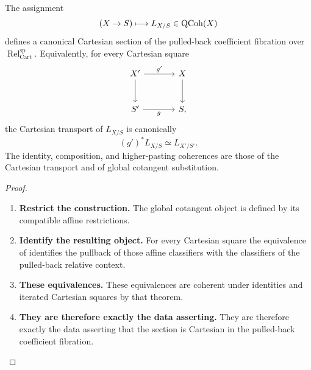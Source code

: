 \begin{theorem}
\label{thm:cotangent-cartesian-section}
The assignment
\[
    (X\to S)\longmapsto L_{X/S}\in\operatorname{QCoh}(X)
\]
defines a canonical Cartesian section of the pulled-back coefficient
fibration over \(\operatorname{Rel}^{\mathrm{sp}}_{\mathrm{Cart}}\).
Equivalently, for every Cartesian square
\[
\begin{tikzcd}[column sep=large,row sep=large]
    X' \arrow[r,"g'"] \arrow[d]
        & X \arrow[d]
    \\
    S' \arrow[r,"g"']
        & S,
\end{tikzcd}
\]
the Cartesian transport of \(L_{X/S}\) is canonically
\[
    (g')^*L_{X/S}\simeq L_{X'/S'}.
\]
The identity, composition, and higher-pasting coherences are those of the
Cartesian transport and of global cotangent substitution.
\end{theorem}

\begin{proof}
\leavevmode
\begin{enumerate}[label=\textup{(\arabic*)}]
    \item \textbf{Restrict the construction.}
    The global cotangent object is defined by its compatible affine restrictions.

    \item \textbf{Identify the resulting object.}
    For every Cartesian square the equivalence of 
    identifies the pullback of those affine classifiers with the classifiers of the pulled-back
    relative context.

    \item \textbf{These equivalences.}
    These equivalences are coherent under identities and iterated Cartesian squares by that
    theorem.

    \item \textbf{They are therefore exactly the data asserting.}
    They are therefore exactly the data asserting that the section is Cartesian in the
    pulled-back coefficient fibration.
\end{enumerate}
\end{proof}

